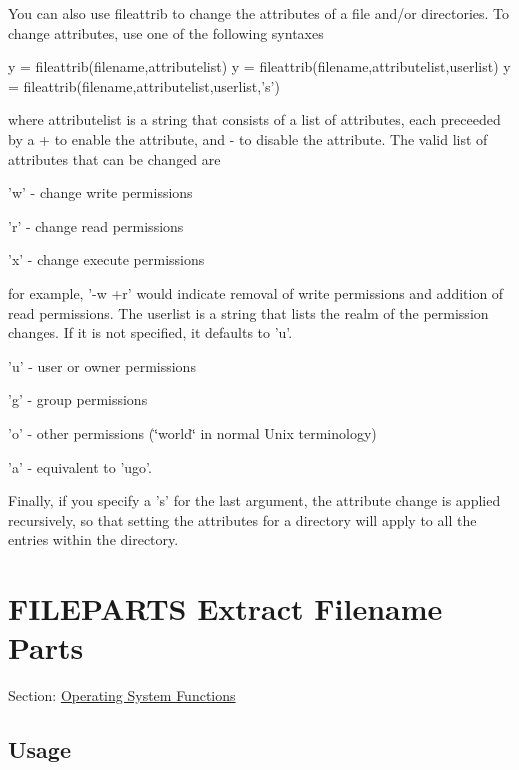 You can also use {\ttfamily fileattrib} to change the attributes of a file and/or directories. To change attributes, use one of the following syntaxes \begin{DoxyVerb}   y = fileattrib(filename,attributelist)
   y = fileattrib(filename,attributelist,userlist)
   y = fileattrib(filename,attributelist,userlist,'s')
\end{DoxyVerb}
 where {\ttfamily attributelist} is a string that consists of a list of attributes, each preceeded by a {\ttfamily +} to enable the attribute, and {\ttfamily -\/} to disable the attribute. The valid list of attributes that can be changed are 
\begin{DoxyItemize}
\item {\ttfamily 'w'} -\/ change write permissions  
\item {\ttfamily 'r'} -\/ change read permissions  
\item {\ttfamily 'x'} -\/ change execute permissions  
\end{DoxyItemize}for example, {\ttfamily '-\/w +r'} would indicate removal of write permissions and addition of read permissions. The {\ttfamily userlist} is a string that lists the realm of the permission changes. If it is not specified, it defaults to {\ttfamily 'u'}. 
\begin{DoxyItemize}
\item {\ttfamily 'u'} -\/ user or owner permissions  
\item {\ttfamily 'g'} -\/ group permissions  
\item {\ttfamily 'o'} -\/ other permissions (\char`\"{}world\char`\"{} in normal Unix terminology)  
\item {\ttfamily 'a'} -\/ equivalent to 'ugo'.  
\end{DoxyItemize}Finally, if you specify a {\ttfamily 's'} for the last argument, the attribute change is applied recursively, so that setting the attributes for a directory will apply to all the entries within the directory. \hypertarget{os_fileparts}{}\section{F\-I\-L\-E\-P\-A\-R\-T\-S Extract Filename Parts}\label{os_fileparts}
Section\-: \hyperlink{sec_os}{Operating System Functions} \hypertarget{vtkwidgets_vtkxyplotwidget_Usage}{}\subsection{Usage}\label{vtkwidgets_vtkxyplotwidget_Usage}
